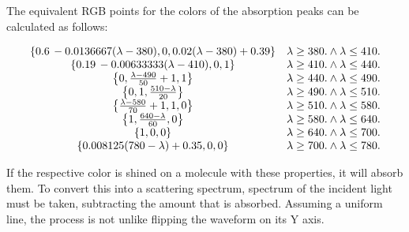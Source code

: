 The equivalent RGB points for the colors of the absorption peaks can be calculated as follows:

\begin{equation}
\begin{array}{cc}
 \{0.6\, -0.0136667 (\lambda -380),0,0.02 (\lambda -380)+0.39\} & \lambda \geq 380.\land \lambda \leq 410. \\
 \{0.19\, -0.00633333 (\lambda -410),0,1\} & \lambda \geq 410.\land \lambda \leq 440. \\
 \left\{0,\frac{\lambda -490}{50}+1,1\right\} & \lambda \geq 440.\land \lambda \leq 490. \\
 \left\{0,1,\frac{510-\lambda }{20}\right\} & \lambda \geq 490.\land \lambda \leq 510. \\
 \left\{\frac{\lambda -580}{70}+1,1,0\right\} & \lambda \geq 510.\land \lambda \leq 580. \\
 \left\{1,\frac{640-\lambda }{60},0\right\} & \lambda \geq 580.\land \lambda \leq 640. \\
 \{1,0,0\} & \lambda \geq 640.\land \lambda \leq 700. \\
 \{0.008125 (780-\lambda )+0.35,0,0\} & \lambda \geq 700.\land \lambda \leq 780. \\
\end{array}
 \\
\end{equation}

If the respective color is shined on a molecule with these properties, it will absorb them. To convert this into a scattering spectrum, spectrum of the incident light must be taken, subtracting the amount that is absorbed. Assuming a uniform line, the process is not unlike flipping the waveform on its Y axis.

